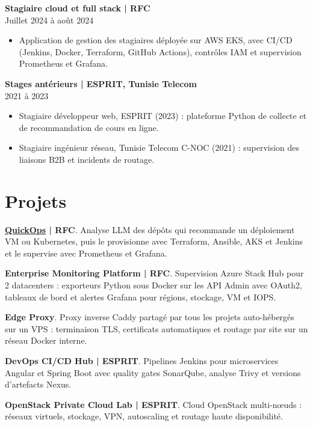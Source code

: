 \documentclass[11pt,a4paper]{article}
\newcommand{\role}[3]{\Needspace{5\baselineskip}\textbf{#1 | #2}\\#3\par}
\newcommand{\group}[1]{\Needspace{4\baselineskip}\vspace{4pt}{\bfseries\color{accent}#1}\par}
\newcommand{\project}[2]{\Needspace{3\baselineskip}\textbf{#1}. #2\par}
\begin{document}
\role{Stagiaire cloud et full stack}{RFC}{Juillet 2024 à août 2024}
\begin{itemize}
\item Application de gestion des stagiaires déployée sur AWS EKS, avec CI/CD (Jenkins, Docker, Terraform, GitHub Actions), contrôles IAM et supervision Prometheus et Grafana.
\end{itemize}

\role{Stages antérieurs}{ESPRIT, Tunisie Telecom}{2021 à 2023}
\begin{itemize}
\item Stagiaire développeur web, ESPRIT (2023) : plateforme Python de collecte et de recommandation de cours en ligne.
\item Stagiaire ingénieur réseau, Tunisie Telecom C-NOC (2021) : supervision des liaisons B2B et incidents de routage.
\end{itemize}

\section{Projets}
\group{Cloud et DevOps}
\project{\href{https://github.com/tamim-hmizi/QuickOps-Frontend}{QuickOps} | RFC}{Analyse LLM des dépôts qui recommande un déploiement VM ou Kubernetes, puis le provisionne avec Terraform, Ansible, AKS et Jenkins et le supervise avec Prometheus et Grafana.}
\project{Enterprise Monitoring Platform | RFC}{Supervision Azure Stack Hub pour 2 datacenters : exporteurs Python sous Docker sur les API Admin avec OAuth2, tableaux de bord et alertes Grafana pour régions, stockage, VM et IOPS.}
\project{Edge Proxy}{Proxy inverse Caddy partagé par tous les projets auto-hébergés sur un VPS : terminaison TLS, certificats automatiques et routage par site sur un réseau Docker interne.}
\project{DevOps CI/CD Hub | ESPRIT}{Pipelines Jenkins pour microservices Angular et Spring Boot avec quality gates SonarQube, analyse Trivy et versions d'artefacts Nexus.}
\project{OpenStack Private Cloud Lab | ESPRIT}{Cloud OpenStack multi-nœuds : réseaux virtuels, stockage, VPN, autoscaling et routage haute disponibilité.}
\end{document}
